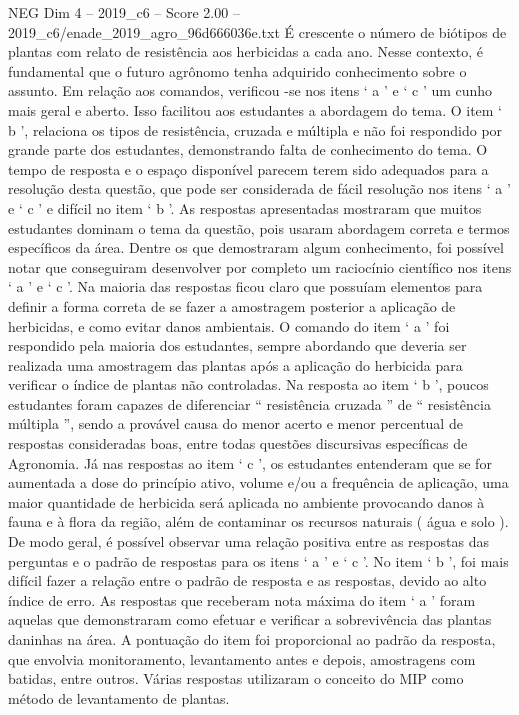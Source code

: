 \begin{textsample}{NEG Dim 4 – 2019\_c6 – Score 2.00 – 2019\_c6/enade\_2019\_agro\_96d666036e.txt}
É crescente o número de biótipos de plantas com relato de resistência aos herbicidas a cada ano.
Nesse contexto, é fundamental que o futuro agrônomo tenha adquirido conhecimento sobre o assunto.
Em relação aos comandos, verificou -se nos itens ‘ a ’ e ‘ c ’ um cunho mais geral e aberto.
Isso facilitou aos estudantes a abordagem do tema.
O item ‘ b ’, relaciona os tipos de resistência, cruzada e múltipla e não foi respondido por grande parte dos estudantes, demonstrando falta de conhecimento do tema.
O tempo de resposta e o espaço disponível parecem terem sido adequados para a resolução desta questão, que pode ser considerada de fácil resolução nos itens ‘ a ’ e ‘ c ’ e difícil no item ‘ b ’.
As respostas apresentadas mostraram que muitos estudantes dominam o tema da questão, pois usaram abordagem correta e termos específicos da área.
Dentre os que demostraram algum conhecimento, foi possível notar que conseguiram desenvolver por completo um raciocínio científico nos itens ‘ a ’ e ‘ c ’.
Na maioria das respostas ficou claro que possuíam elementos para definir a forma correta de se fazer a amostragem posterior a aplicação de herbicidas, e como evitar danos ambientais.
O comando do item ‘ a ’ foi respondido pela maioria dos estudantes, sempre abordando que deveria ser realizada uma amostragem das plantas após a aplicação do herbicida para verificar o índice de plantas não controladas.
Na resposta ao item ‘ b ’, poucos estudantes foram capazes de diferenciar “ resistência cruzada ” de “ resistência múltipla ”, sendo a provável causa do menor acerto e menor percentual de respostas consideradas boas, entre todas questões discursivas específicas de Agronomia.
Já nas respostas ao item ‘ c ’, os estudantes entenderam que se for aumentada a dose do princípio ativo, volume e/ou a frequência de aplicação, uma maior quantidade de herbicida será aplicada no ambiente provocando danos à fauna e à flora da região, além de contaminar os recursos naturais ( água e solo ).
De modo geral, é possível observar uma relação positiva entre as respostas das perguntas e o padrão de respostas para os itens ‘ a ’ e ‘ c ’.
No item ‘ b ’, foi mais difícil fazer a relação entre o padrão de resposta e as respostas, devido ao alto índice de erro.
As respostas que receberam nota máxima do item ‘ a ’ foram aquelas que demonstraram como efetuar e verificar a sobrevivência das plantas daninhas na área.
A pontuação do item foi proporcional ao padrão da resposta, que envolvia monitoramento, levantamento antes e depois, amostragens com batidas, entre outros.
Várias respostas utilizaram o conceito do MIP como método de levantamento de plantas.

\end{textsample}
